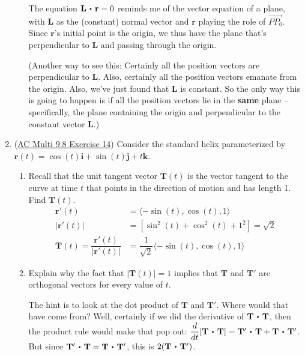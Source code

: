 \documentclass[10pt]{article}
\newcommand{\vi}{\mathbf{i}}
\newcommand{\vj}{\mathbf{j}}
\newcommand{\vk}{\mathbf{k}}
\newcommand{\vr}{\mathbf{r}}
\newcommand{\vL}{\mathbf{L}}
\newcommand{\vT}{\mathbf{T}}
\newcommand\dotp[1][.5]{\,\mathbin{\vcenter{\hbox{\scalebox{#1}{$\bullet$}}}}\,}
\newenvironment{red}{\color{red}}{\ignorespacesafterend}
\begin{document}
\begin{enumerate}[leftmargin=0pt]
\begin{enumerate}
    \begin{red}
    The equation $\vL \dotp \vr = 0$ reminds me of the vector equation of a plane, with $\vL$ as the (constant) normal vector and $\vr$ playing the role of $\overrightarrow{PP_0}$. Since $\vr$'s initial point is the origin, we thus have the plane that's perpendicular to $\vL$ and passing through the origin.
    
    (Another way to see this: Certainly all the position vectors are perpendicular to $\vL$. Also, certainly all the position vectors emanate from the origin. Also, we've just found that $\vL$ is constant. So the only way this is going to happen is if all the position vectors lie in the \textbf{same} plane -- specifically, the plane containing the origin and perpendicular to the constant vector $\vL$.)
    \end{red}
\end{enumerate}

\item (\href{https://activecalculus.org/multi/S-9-8-Arc-Length-Curvature.html#Ez_9_8_4}{AC Multi 9.8 Exercise 14}) Consider the standard helix parameterized by $\vr(t) = \cos(t) \vi + \sin(t) \vj + t \vk$.
\begin{enumerate}
    \item Recall that the unit tangent vector $\vT(t)$ is the vector tangent to the curve at time $t$ that points in the direction of motion and has length 1. Find $\vT(t)$.
    \begin{red}
        \begin{align*}
            \vr'(t) &= \langle -\sin(t), \cos(t), 1 \rangle \\
            |\vr'(t)| &= \left[\sin^2(t) + \cos^2(t) + 1^2\right] = \sqrt{2} \\
            \vT(t) = \dfrac{\vr'(t)}{|\vr'(t)|} &= \dfrac{1}{\sqrt{2}} \langle -\sin(t), \cos(t), 1 \rangle
        \end{align*}
    \end{red}
    \item Explain why the fact that $|\vT(t)|=1$ implies that $\vT$ and $\vT'$ are orthogonal vectors for every value of $t$. 

    \begin{red}
        The hint is to look at the dot product of $\vT$ and $\vT'$. Where would that have come from? Well, certainly if we did the derivative of $\vT \dotp \vT$, then the product rule would make that pop out:
        $\dfrac{d}{dt} [\vT\dotp\vT] = \vT' \dotp \vT + \vT \dotp \vT'$. But since $\vT' \dotp \vT = \vT \dotp \vT'$, this is $2(\vT\dotp \vT')$.


\end{red}
\end{enumerate}
\end{enumerate}
\end{document}
